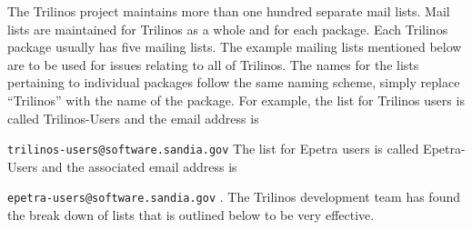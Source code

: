 \documentclass[12pt,relax]{article}
\newcommand{\InlineCommand}[1]{
  {\hspace{0.01 in}} {\tt #1} {\hspace{0.01 in}}}
\begin{document}
The Trilinos project maintains more than one hundred separate mail lists.  
Mail lists are maintained for Trilinos as a whole and for each 
package.  Each Trilinos 
package usually has five mailing lists.  The example mailing lists mentioned 
below are to be used for issues relating to all of Trilinos.  
The names for the lists pertaining to individual packages follow the same 
naming scheme, simply replace ``Trilinos'' with the name of the package.  For example, the list for Trilinos users is 
called Trilinos-Users and the email address is 
\InlineCommand{trilinos-users@software.sandia.gov}  The list 
for Epetra users is called Epetra-Users and the associated email address is 
\InlineCommand{epetra-users@software.sandia.gov}.  
The 
Trilinos development team has found the break down of lists that is outlined 
below to be very effective.
\end{document}
